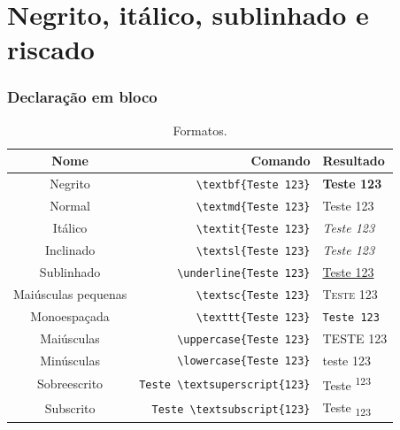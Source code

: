 \documentclass{beamer}
\begin{document}
\section{Negrito, itálico, sublinhado e riscado}
\begin{frame}[fragile]
    \frametitle{Declaração em bloco}

    \begin{table}[h]
        \caption{Formatos.}
        \begin{tabular}{c|r|l}
            Nome & Comando & Resultado \\ \hline 
            Negrito & \lstinline[style=myStyleLatex]!\textbf{Teste 123}! & \textbf{Teste 123} \\ \hline 
            Normal & \lstinline[style=myStyleLatex]!\textmd{Teste 123}! & \textmd{Teste 123} \\ \hline 
            Itálico & \lstinline[style=myStyleLatex]!\textit{Teste 123}! & \textit{Teste 123} \\ \hline 
            Inclinado & \lstinline[style=myStyleLatex]!\textsl{Teste 123}! & \textsl{Teste 123} \\ \hline
            Sublinhado & \lstinline[style=myStyleLatex]!\underline{Teste 123}! & \underline{Teste 123} \\ \hline 
            Maiúsculas pequenas & \lstinline[style=myStyleLatex]!\textsc{Teste 123}! & \textsc{Teste 123} \\ \hline
            Monoespaçada & \lstinline[style=myStyleLatex]!\texttt{Teste 123}! & \texttt{Teste 123} \\ \hline
            Maiúsculas & \lstinline[style=myStyleLatex]!\uppercase{Teste 123}! & \uppercase{Teste 123} \\ \hline 
            Minúsculas & \lstinline[style=myStyleLatex]!\lowercase{Teste 123}! & \lowercase{Teste 123} \\ \hline 
            Sobreescrito & \lstinline[style=myStyleLatex]!Teste \textsuperscript{123}! & Teste \textsuperscript{123} \\ \hline
            Subscrito & \lstinline[style=myStyleLatex]!Teste \textsubscript{123}! & Teste \textsubscript{123} \\ \hline
        \end{tabular}
    \end{table}

\end{frame}
\end{document}
